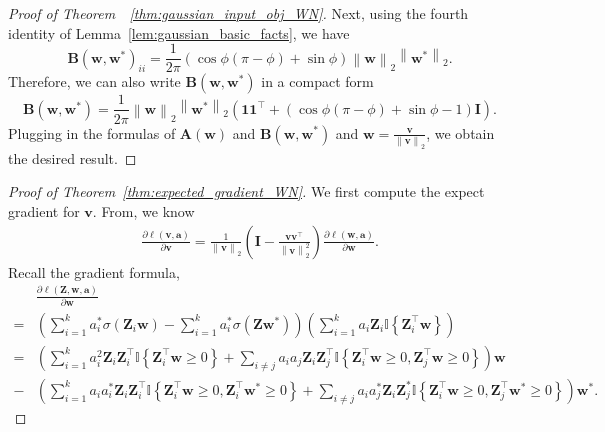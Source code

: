 \documentclass{article}
\newcommand{\firstlayer}{w}
\newcommand{\firstlayerWN}{v}
\newcommand{\secondlayer}{a}
\newcommand{\mat}[1]{\mathbf{#1}}
\newcommand{\vect}[1]{\mathbf{#1}}
\newcommand{\norm}[1]{\left\|#1\right\|}
\newcommand{\indict}{\mathbb{I}}
\newcommand{\relu}[1]{\sigma\left(#1\right)}
\begin{document}
\begin{proof}[Proof of Theorem~~\ref{thm:gaussian_input_obj_WN}]
Next, using the fourth identity of Lemma~\ref{lem:gaussian_basic_facts}, we have \[\mat{B}\left(\vect{w},\vect{w}^*\right)_{ii} = \frac{1}{2\pi}\left(\cos\phi\left(\pi-\phi\right)+\sin\phi\right)\norm{\vect{w}}_2\norm{\vect{w}^*}_2.\]
Therefore, we can also write $\mat{B}\left(\vect{w},\vect{w}^*\right)$ in a compact form\[
\mat{B}\left(\vect{w},\vect{w}^*\right) = \frac{1}{2\pi}\norm{\vect{w}}_2\norm{\vect{w}^*}_2\left(\vect{1}\vect{1}^\top + \left(\cos\phi\left(\pi-\phi\right)+\sin\phi-1\right)\mat{I}\right).
\]
Plugging in the formulas of $\mat{A}(\vect{w})$ and $\mat{B}\left(\vect{w},\vect{w}^*\right)$ and $\vect{\firstlayer} = \frac{\vect{\firstlayerWN}}{\norm{\vect{\firstlayerWN}}_2}$, we obtain the desired result.
\end{proof}\begin{proof}[Proof of Theorem~\ref{thm:expected_gradient_WN}]
We first compute the expect gradient for $\vect{\firstlayerWN}$.
From\citep{salimans2016weight}, we know\begin{align*}
\frac{\partial \ell\left(\vect{\firstlayerWN},\vect{\secondlayer}\right)}{\partial \vect{\firstlayerWN}} = \frac{1}{\norm{\vect{\firstlayerWN}}_2}\left(\mat{I}-\frac{\vect{\firstlayerWN}\vect{\firstlayerWN}^\top}{\norm{\vect{\firstlayerWN}}_2^2}\right)\frac{\partial \ell\left(\vect{\firstlayer},\vect{\secondlayer}\right)}{\partial \vect{\firstlayer}}.
\end{align*}
Recall the gradient formula, \begin{align}
&\frac{\partial \ell\left(\mat{Z},\vect{w},\vect{\secondlayer}\right)}{\partial \vect{w}}\nonumber\\  = &\left(\sum_{i=1}^{k}\secondlayer_i^*\relu{\mat{Z}_i\vect{w}}-\sum_{i=1}^{k}\secondlayer^*_i\relu{\mat{Z}\vect{w}^*}\right)\left(\sum_{i=1}^{k}\secondlayer_i\mat{Z}_i\indict\left\{\mat{Z}_i^\top\vect{w}\right\}\right) \nonumber \\
 = &\left(\sum_{i=1}^{k}\secondlayer_i^2\mat{Z}_i\mat{Z}_i^\top\indict\left\{\mat{Z}_i^\top \vect{w}\ge 0\right\}+\sum_{i\neq j}\secondlayer_i\secondlayer_j\mat{Z}_i\mat{Z}_j^\top\indict\left\{\mat{Z}_i^\top\vect{w}\ge 0,\mat{Z}_j^\top\vect{w} \ge 0 \right\}\right)\vect{w} \label{eqn:w_grad_w_term}\\
- &\left(\sum_{i=1}^{k}\secondlayer_i\secondlayer_i^*\mat{Z}_i\mat{Z}_i^\top
\indict\left\{\mat{Z}_i^\top\vect{w}\ge 0,\mat{Z}_i^\top\vect{w}^*\ge 0\right\}
+ \sum_{i\neq j}\secondlayer_i\secondlayer_j^*\mat{Z}_i\mat{Z}_j^*\indict\left\{\mat{Z}_i^\top\vect{w}\ge 0,\mat{Z}_j^\top \vect{w}^* \ge 0\right\}\right)\vect{w}^*. \label{eqn:w_grad_w*_term}

\end{align}
\end{proof}
\end{document}
